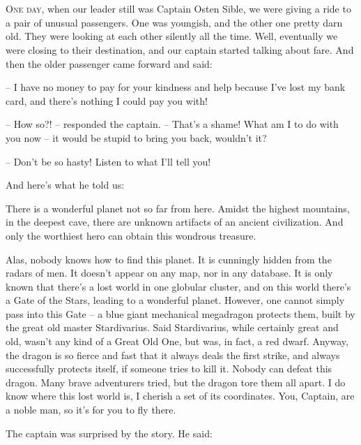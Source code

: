 \documentclass[ebook,oneside,final,openright]{memoir}
\begin{document}
\chapter{}
\par
\lettrine{O}{ne day,} when our leader still was Captain Osten Sible, we were giving a ride to a pair of unusual passengers. One was youngish, and the other one pretty darn old. They were looking at each other silently all the time. Well, eventually we were closing to their destination, and our captain started talking about fare. And then the older passenger came forward and said: \par
\par
– I have no money to pay for your kindness and help because I’ve lost my bank card, and there’s nothing I could pay you with!\par
– How so?! – responded the captain. – That’s a shame! What am I to do with you now – it would be stupid to bring you back, wouldn’t it? \par
– Don’t be so hasty! Listen to what I’ll tell you! \par
 And here’s what he told us:\par
\par
 There is a wonderful planet not so far from here. Amidst the highest mountains, in the deepest cave, there are unknown artifacts of an ancient civilization. And only the worthiest hero can obtain this wondrous treasure. \par
Alas, nobody knows how to find this planet. It is cunningly hidden from the radars of men. It doesn’t appear on any map, nor in any database. It is only known that there’s a lost world in one globular cluster, and on this world there’s a Gate of the Stars, leading to a wonderful planet. However, one cannot simply pass into this Gate – a blue giant mechanical megadragon protects them, built by the great old master Stardivarius. Said Stardivarius, while certainly great and old, wasn’t any kind of a Great Old One, but was, in fact, a red dwarf. Anyway, the dragon is so fierce and fast that it always deals the first strike, and always successfully protects itself, if someone tries to kill it. Nobody can defeat this dragon. Many brave adventurers tried, but the dragon tore them all apart. I do know where this lost world is, I cherish a set of its coordinates. You, Captain, are a noble man, so it’s for you to fly there.\par
\par
The captain was surprised by the story. He said:\par
\end{document}
